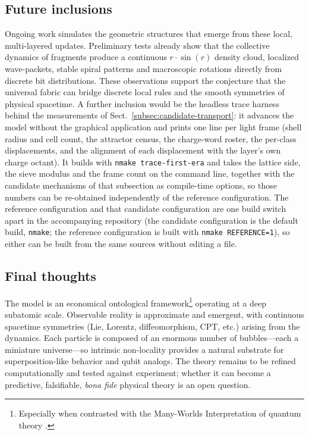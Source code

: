 \documentclass[a4paper]{article}
\begin{document}
\subsection{Future inclusions}
Ongoing work simulates the geometric structures that emerge from these local, multi-layered updates. Preliminary tests already show that the collective dynamics of fragments produce a continuous $r \cdot \sin(r)$ density cloud, localized wave-packets, stable spiral patterns and macroscopic rotations directly from discrete bit distributions. These observations support the conjecture that the universal fabric can bridge discrete local rules and the smooth symmetries of physical spacetime.  A further inclusion would be the headless trace harness behind the measurements of Sect.~\ref{subsec:candidate-transport}: it advances the model without the graphical application and prints one line per light frame (shell radius and cell count, the attractor census, the charge-word roster, the per-class displacements, and the alignment of each displacement with the layer's own charge octant).  It builds with \texttt{nmake trace-first-era} and takes the lattice side, the sieve modulus and the frame count on the command line, together with the candidate mechanisms of that subsection as compile-time options, so those numbers can be re-obtained independently of the reference configuration.  The reference configuration and that candidate configuration are one build switch apart in the accompanying repository (the candidate configuration is the default build, \texttt{nmake}; the reference configuration is built with \texttt{nmake REFERENCE=1}), so either can be built from the same sources without editing a file.
\subsection{Final thoughts}
The model is an economical ontological framework\footnote{Especially when contrasted with the Many-Worlds Interpretation of quantum theory \cite{everett1957}.} operating at a deep subatomic scale. Observable reality is approximate and emergent, with continuous spacetime symmetries (Lie, Lorentz, diffeomorphism, CPT, etc.) arising from the dynamics. Each particle is composed of an enormous number of bubbles---each a miniature universe---so intrinsic non-locality provides a natural substrate for superposition-like behavior and qubit analogs. The theory remains to be refined computationally and tested against experiment; whether it can become a predictive, falsifiable, \emph{bona fide} physical theory is an open question.
\end{document}
